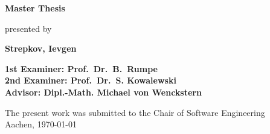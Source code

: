 \begin{titlepage}
\begin{flushleft}
{    {\Large \textbf{Master Thesis}\\}
		\vspace{3em} 
		
		{\large presented by\\} 
    
    {\LARGE \textbf{Strepkov, Ievgen}\\}
    \vspace{3em} 
		    
    {\Large \textbf{1st Examiner: Prof.\ Dr.\ B.\ Rumpe}\\}
    \vspace{1em}
    {\Large \textbf{2nd Examiner: Prof.\ Dr.\ S. Kowalewski }\\}
    \vspace{1em} 
    {\Large \textbf{Advisor: Dipl.-Math. Michael von Wenckstern }\\}
    \vspace{7em} 

    {\large The present work was submitted to the Chair of Software Engineering \\}
    \vspace{1em}
		{\large	Aachen, \today\\}
  }
\end{flushleft}

\end{titlepage}





